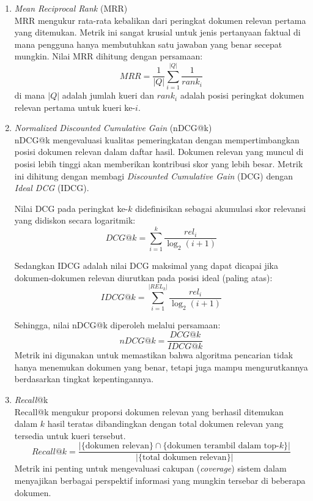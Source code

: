 \begin{enumerate}[noitemsep]
    \item \textit{Mean Reciprocal Rank} (MRR) \\
    MRR mengukur rata-rata kebalikan dari peringkat dokumen relevan pertama yang ditemukan. Metrik ini sangat krusial untuk jenis pertanyaan faktual di mana pengguna hanya membutuhkan satu jawaban yang benar secepat mungkin. Nilai MRR dihitung dengan persamaan:
    \begin{equation}
        MRR = \frac{1}{|Q|} \sum_{i=1}^{|Q|} \frac{1}{rank_i}
    \end{equation}
    di mana $|Q|$ adalah jumlah kueri dan $rank_i$ adalah posisi peringkat dokumen relevan pertama untuk kueri ke-$i$.

    \item \textit{Normalized Discounted Cumulative Gain} (nDCG@k) \\
    nDCG@k mengevaluasi kualitas pemeringkatan dengan mempertimbangkan posisi dokumen relevan dalam daftar hasil. Dokumen relevan yang muncul di posisi lebih tinggi akan memberikan kontribusi skor yang lebih besar. Metrik ini dihitung dengan membagi \textit{Discounted Cumulative Gain} (DCG) dengan \textit{Ideal DCG} (IDCG).

    Nilai DCG pada peringkat ke-$k$ didefinisikan sebagai akumulasi skor relevansi yang didiskon secara logaritmik:
    \begin{equation}
        DCG@k = \sum_{i=1}^{k} \frac{rel_i}{\log_2(i+1)}
    \end{equation}

    Sedangkan IDCG adalah nilai DCG maksimal yang dapat dicapai jika dokumen-dokumen relevan diurutkan pada posisi ideal (paling atas):
    \begin{equation}
        IDCG@k = \sum_{i=1}^{|REL_k|} \frac{rel_i}{\log_2(i+1)}
    \end{equation}

    Sehingga, nilai nDCG@k diperoleh melalui persamaan:
    \begin{equation}
        nDCG@k = \frac{DCG@k}{IDCG@k}
    \end{equation}
    Metrik ini digunakan untuk memastikan bahwa algoritma pencarian tidak hanya menemukan dokumen yang benar, tetapi juga mampu mengurutkannya berdasarkan tingkat kepentingannya.

    \item \textit{Recall}@k \\
    Recall@k mengukur proporsi dokumen relevan yang berhasil ditemukan dalam $k$ hasil teratas dibandingkan dengan total dokumen relevan yang tersedia untuk kueri tersebut.
    \begin{equation}
        Recall@k = \frac{|\{ \text{dokumen relevan} \} \cap \{ \text{dokumen terambil dalam top-}k \}|}{|\{ \text{total dokumen relevan} \}|}
    \end{equation}
    Metrik ini penting untuk mengevaluasi cakupan (\textit{coverage}) sistem dalam menyajikan berbagai perspektif informasi yang mungkin tersebar di beberapa dokumen.
\end{enumerate}

